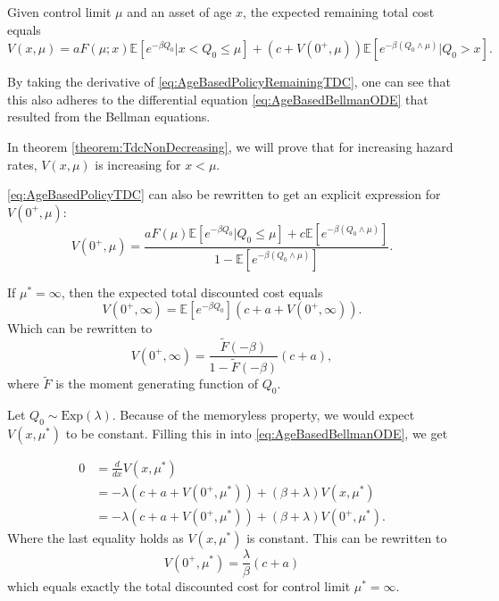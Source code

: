 \begin{theorem}
	Given control limit $\mu$ and an asset of age $x$, the expected remaining total cost equals 
	\begin{equation}\label{eq:AgeBasedPolicyRemainingTDC}
	V(x,\mu)=aF(\mu;x)\mathbb{E}[e^{-\beta Q_0}|x<Q_0\leq \mu]+(c+V(0^+,\mu))\mathbb{E}[e^{-\beta(Q_0\wedge\mu)}|Q_0>x].
	\end{equation}
\end{theorem}

\begin{remark}
	By taking the derivative of \eqref{eq:AgeBasedPolicyRemainingTDC}, one can see that this also adheres to the differential equation \eqref{eq:AgeBasedBellmanODE} that resulted from the Bellman equations.
\end{remark}

\begin{remark}
	In theorem \ref{theorem:TdcNonDecreasing}, we will prove that for increasing hazard rates, $V(x,\mu)$ is increasing for $x<\mu$.
\end{remark}

\begin{remark}
	\eqref{eq:AgeBasedPolicyTDC} can also be rewritten to get an explicit expression for $V(0^+,\mu)$:
	\begin{equation}\label{eq:AgeBasedOptimalTDC}
	V(0^+,\mu)=\frac{aF(\mu)\mathbb{E}[e^{-\beta Q_0}|Q_0\leq \mu]+c\mathbb{E}[e^{-\beta(Q_0\wedge\mu)}]}{1-\mathbb{E}[e^{-\beta (Q_0\wedge\mu)}]}.
	\end{equation}
\end{remark}

\begin{remark}
	If $\mu^*=\infty$, then the expected total discounted cost equals
	\[V(0^+,\infty)=\mathbb{E}[e^{-\beta Q_0}](c+a+V(0^+,\infty)).\]
	Which can be rewritten to
	\[V(0^+,\infty)=\frac{\tilde{F}(-\beta)}{1-\tilde{F}(-\beta)}(c+a),\]
	where $\tilde{F}$ is the moment generating function of $Q_0$.
\end{remark}

\begin{example}
	Let $Q_0\sim\text{Exp}(\lambda)$.
	Because of the memoryless property, we would expect $V(x,\mu^*)$ to be constant.
	Filling this in into \eqref{eq:AgeBasedBellmanODE}, we get
	
	\[
	\begin{split}
	0&=\frac{d}{dx}V(x,\mu^*)\\
	&=-\lambda(c+a+ V(0^+,\mu^*))+(\beta+ \lambda) V(x,\mu^*)\\
	&=-\lambda(c+a+ V(0^+,\mu^*))+(\beta+ \lambda) V(0^+,\mu^*).
	\end{split}
	\]
	Where the last equality holds as $V(x,\mu^*)$ is constant.
	This can be rewritten to
	$$
	V(0^+,\mu^*)=\frac{\lambda}{\beta}(c+a)
	$$
	which equals exactly the total discounted cost for control limit $\mu^*=\infty$.
\end{example}